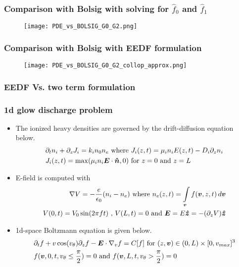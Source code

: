 \documentclass[mathserif, aspectratio=169]{beamer}
\newcommand{\vect}[1]{\boldsymbol{#1}}
\newcommand{\of}[1]{\mleft( #1 \mright)}
\newcommand{\myint}{\int\limits}
\newcommand{\diff}[1]{\, d#1}
\newcommand{\vtheta}{{v_{\theta}}}
\begin{document}
\begin{frame}
	\frametitle{\small Comparison with Bolsig with solving for $\hat{f}_0$ and $\hat{f}_1$}
	\begin{figure}
		\texttt{[image: PDE\_vs\_BOLSIG\_G0\_G2.png]}
	\end{figure}
\end{frame}


\begin{frame}
	\frametitle{\small Comparison with Bolsig with EEDF formulation}
	\begin{figure}
		\texttt{[image: PDE\_vs\_BOLSIG\_G0\_G2\_collop\_approx.png]}
	\end{figure}
\end{frame}

\begin{frame}
	\frametitle{EEDF Vs. two term formulation}
	\begin{figure}
	\end{figure}
\end{frame}


\begin{frame}
	\frametitle{1d glow discharge problem}
	\begin{itemize}
		\item The ionized heavy densities are governed by the drift-diffusion equation below.
			\begin{align*}
			&\partial_t n_i + \partial_z J_i = k_i n_0 n_e \text{ where } J_i\of{z, t} = \mu_i n_i E\of{z,t} -D_i \partial_z n_i\\
			&J_i(z,t)=\max\of{\mu_i n_i \vect{E}\cdot \vect{\hat{n}},0} \text{ for } z =0 \text{ and } z=L
			\end{align*}
		\item E-field is computed with 
			\begin{align*}
			\nabla V = -\frac{e}{\epsilon_0} (n_i-n_e) \text{ where } n_e(z,t) = \myint_{\vect{v}} f(\vect{v}, z, t) \diff{\vect{v}} \\
			V(0,t) = V_0 \sin(2\pi ft) \text{ , } V(L,t) = 0 \text{ and } \vect{E} = E \vect{\hat{z}} = -\of{\partial_z V} \vect{\hat{z}}
			\end{align*}
		\item 1d-space Boltzmann equation is given below. 
		\begin{align*}
			&	\partial_t f + v\cos\of{\vtheta} \partial_z f -\vect{E}\cdot\nabla_v f = C[f] \text{ for } (z,\vect{v}) \in (0,L) \times[0,v_{max}]^3 \\
			& f(\vect{v}, 0, t, \vtheta \leq \frac{\pi}{2})	= 0 \text{ and } f(\vect{v}, L, t, \vtheta > \frac{\pi}{2})	= 0
		\end{align*}
	\end{itemize}
\end{frame}
\end{document}
